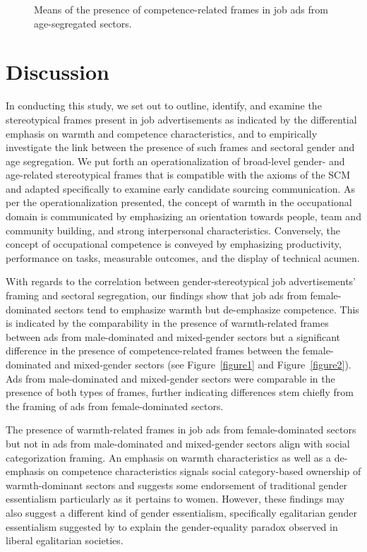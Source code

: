 \documentclass[jou]{apa7}
\begin{document}
\begin{figure*}
    \caption{Means of the presence of competence-related frames in job ads from age-segregated sectors.}
    \label{figure4}
    \end{figure*}

\clearpage
\section{Discussion}
\label{discussion}
In conducting this study, we set out to outline, identify, and examine the stereotypical frames present in job advertisements as indicated by the differential emphasis on warmth and competence characteristics, and to empirically investigate the link between the presence of such frames and sectoral gender and age segregation. We put forth an operationalization of broad-level gender- and age-related stereotypical frames that is compatible with the axioms of the SCM and adapted specifically to examine early candidate sourcing communication. As per the operationalization presented, the concept of warmth in the occupational domain is communicated by emphasizing an orientation towards people, team and community building, and strong interpersonal characteristics. Conversely, the concept of occupational competence is conveyed by emphasizing productivity, performance on tasks, measurable outcomes, and the display of technical acumen.

With regards to the correlation between gender-stereotypical job advertisements’ framing and sectoral segregation, our findings show that job ads from female-dominated sectors tend to emphasize warmth but de-emphasize competence. This is indicated by the comparability in the presence of warmth-related frames between ads from male-dominated and mixed-gender sectors but a significant difference in the presence of competence-related frames between the female-dominated and mixed-gender sectors (see Figure~\ref{figure1} and Figure~\ref{figure2}). Ads from male-dominated and mixed-gender sectors were comparable in the presence of both types of frames, further indicating differences stem chiefly from the framing of ads from female-dominated sectors.

The presence of warmth-related frames in job ads from female-dominated sectors but not in ads from male-dominated and mixed-gender sectors align with social categorization framing. An emphasis on warmth characteristics as well as a de-emphasis on competence characteristics signals social category-based ownership of warmth-dominant sectors and suggests some endorsement of traditional gender essentialism particularly as it pertains to women. However, these findings may also suggest a different kind of gender essentialism, specifically egalitarian gender essentialism suggested by \textcite{cotterEndGenderRevolution2011} to explain the gender-equality paradox observed in liberal egalitarian societies.
\end{document}
